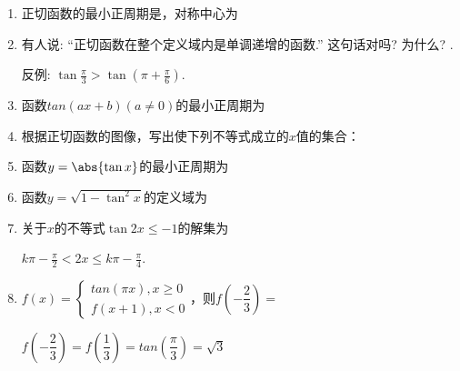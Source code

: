 \begin{enumerate}
\item 正切函数的最小正周期是\blkda{$\pi$}，对称中心为
\item 有人说: ``正切函数在整个定义域内是单调递增的函数.'' 这句话对吗? 为什么? . 
\begin{jieda}
反例: $\tan\frac{\pi}{3}>\tan(\pi+\frac{\pi}{6})$. 
\end{jieda}
\item 函数$tan(ax+b)(a \neq 0)$的最小正周期为
\item 根据正切函数的图像，写出使下列不等式成立的$x$值的集合：\\
\begin{jieda}
\end{jieda}
\item 函数$y=\abs{\tan{x}}$的最小正周期为\blkda{$\pi$}
    \item 函数$y=\sqrt{1-\tan^2x}$的定义域为
    \item 关于$x$的不等式$\tan2x\leq-1$的解集为\blkda[4]{$\left(\dfrac{k\pi}{2}-\dfrac{\pi}{4},\dfrac{k\pi}{2}-\dfrac{\pi}{8}\right](k\zz)$}
    \begin{jieda}
    $k\pi-\frac{\pi}{2}<2x\leq k\pi-\frac{\pi}{4}$. 
    \end{jieda}
    \item $f(x) = \left \{ \begin{array}{l}
         tan(\pi x), x \geq 0 \\
         f(x+1), x < 0
    \end{array} \right.$，则$f\left(-\dfrac{2}{3}\right) = $
    \begin{jieda}
        $f\left(-\dfrac{2}{3}\right) = f\left(\dfrac{1}{3}\right) = tan\left(\dfrac{\pi}{3}\right) = \sqrt{3}$

\end{jieda}
\end{enumerate}
